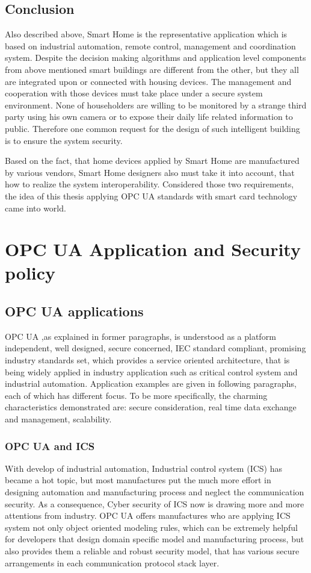 \subsection{Conclusion}
Also described above, Smart Home is the representative application which is based on industrial automation, remote control, management and coordination system. Despite the decision making algorithms and application level components from above mentioned smart buildings are different from the other, but they all are integrated upon or connected with housing devices. The management and cooperation with those devices must take place under a secure system environment. None of householders are willing to be monitored by a strange third party using his own camera or to expose their daily life related information to public. Therefore one common request for the design of such intelligent building is to ensure the system security.

Based on the fact, that home devices applied by Smart Home are manufactured by various vendors,  Smart Home designers also must take it into account, that how to realize the system interoperability. Considered those two requirements, the idea of this thesis applying OPC UA standards with smart card technology came into world. 

\section{OPC UA Application and Security policy }

\subsection{OPC UA applications}
OPC UA ,as explained in former paragraphs,  is understood as a platform independent, well designed, secure concerned, IEC standard compliant, promising industry standards set, which provides a service oriented architecture, that is being widely applied in industry application such as critical control system and industrial automation. Application examples are given in following paragraphs, each of which has different focus. To be more specifically, the charming characteristics demonstrated are: secure consideration, real time data exchange and management, scalability. 

\subsubsection{OPC UA and ICS}
With develop of industrial automation, Industrial control system (ICS) has became a hot topic, but most manufactures put the much more effort in designing automation and manufacturing process and neglect  the communication security. As a consequence, Cyber security of ICS now is drawing more and more attentions from industry. OPC UA offers manufactures who are applying ICS system not only object oriented modeling rules, which can be extremely helpful for developers that design domain specific model and manufacturing process, but also provides them a reliable and robust security model\cite{opc_ics}, that has various secure arrangements in each communication protocol stack layer.



